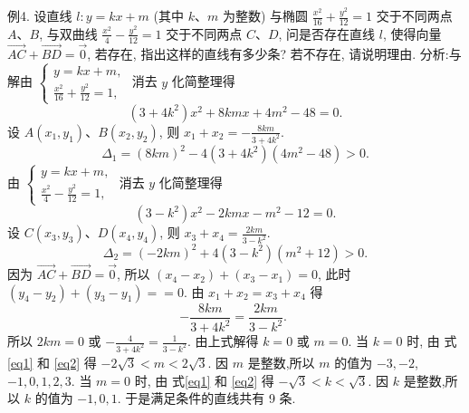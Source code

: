 例4. 设直线 $l: y=k x+m$ (其中 $k 、 m$ 为整数) 与椭圆 $\frac{x^2}{16}+\frac{y^2}{12}=1$ 交于不同两点 $A 、 B$, 与双曲线 $\frac{x^2}{4}-\frac{y^2}{12}=1$ 交于不同两点 $C 、 D$, 问是否存在直线 $l$, 使得向量 $\overrightarrow{A C}+\overrightarrow{B D}=\overrightarrow{0}$, 若存在, 指出这样的直线有多少条? 若不存在, 请说明理由.
分析:与解由 $\left\{\begin{array}{l}y=k x+m, \\ \frac{x^2}{16}+\frac{y^2}{12}=1,\end{array}\right.$ 消去 $y$ 化简整理得
$$
\left(3+4 k^2\right) x^2+8 k m x+4 m^2-48=0 . 
$$
设 $A\left(x_1, y_1\right) 、 B\left(x_2, y_2\right)$, 则 $x_1+x_2=-\frac{8 k m}{3+4 k^2}$.
$$
\Delta_1=(8 k m)^2-4\left(3+4 k^2\right)\left(4 m^2-48\right)>0 . \label{eq1}
$$
由 $\left\{\begin{array}{l}y=k x+m, \\ \frac{x^2}{4}-\frac{y^2}{12}=1,\end{array}\right.$ 消去 $y$ 化简整理得
$$
\left(3-k^2\right) x^2-2 k m x-m^2-12=0 .
$$
设 $C\left(x_3, y_3\right) 、 D\left(x_4, y_4\right)$, 则 $x_3+x_4=\frac{2 k m}{3-k^2}$.
$$
\Delta_2=(-2 k m)^2+4\left(3-k^2\right)\left(m^2+12\right)>0 . \label{eq2}
$$
因为 $\overrightarrow{A C}+\overrightarrow{B D}=\overrightarrow{0}$, 所以 $\left(x_4-x_2\right)+\left(x_3-x_1\right)=0$, 此时 $\left(y_4-y_2\right)+ \left(y_3-y_1\right)==0$. 由 $x_1+x_2=x_3+x_4$ 得
$$
-\frac{8 k m}{3+4 k^2}=\frac{2 k m}{3-k^2} \text {. }
$$
所以 $2 k m=0$ 或 $-\frac{4}{3+4 k^2}=\frac{1}{3-k^2}$. 由上式解得 $k=0$ 或 $m=0$. 当 $k=0$ 时, 由 式\ref{eq1} 和 \ref{eq2} 得 $-2 \sqrt{3}<m<2 \sqrt{3}$. 因 $m$ 是整数,所以 $m$ 的值为 $-3,-2$, $-1,0,1,2,3$. 当 $m=0$ 时, 由 式\ref{eq1} 和 \ref{eq2} 得 $-\sqrt{3}<k<\sqrt{3}$. 因 $k$ 是整数,所以 $k$ 的值为 $-1,0,1$. 于是满足条件的直线共有 9 条.



